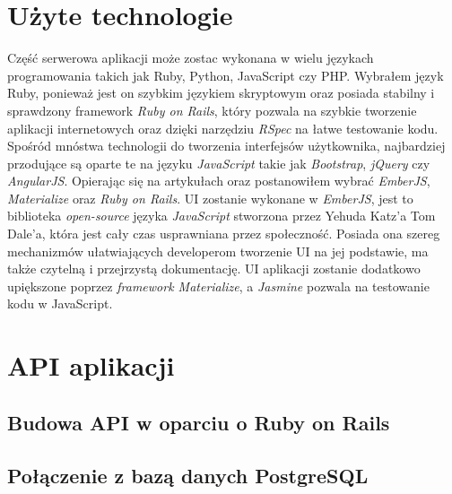\documentclass[brudnopis]{xmgr}
\begin{document}
\section{Użyte technologie}
Część serwerowa aplikacji może zostac wykonana w wielu językach programowania takich jak Ruby, Python, JavaScript czy PHP.
Wybrałem język Ruby, ponieważ jest on szybkim językiem skryptowym oraz posiada stabilny i sprawdzony framework \textit{Ruby on Rails}, który pozwala na szybkie tworzenie aplikacji internetowych oraz dzięki narzędziu \textit{RSpec} na łatwe testowanie kodu. 
Spośród mnóstwa technologii do tworzenia interfejsów użytkownika, najbardziej przodujące są oparte te na języku \textit{JavaScript} takie jak \textit{Bootstrap},\textit{ jQuery} czy\\ \textit{AngularJS}. Opierając się na artykułach \cite{} oraz \cite{} postanowiłem wybrać \textit{EmberJS}, \textit{Materialize} oraz \textit{Ruby on Rails}. UI zostanie wykonane w \textit{EmberJS}, jest to  biblioteka  \textit{open-source} języka \textit{JavaScript} stworzona  przez  Yehuda Katz'a  Tom Dale'a, która jest cały czas usprawniana przez społeczność. Posiada ona szereg mechanizmów ułatwiających developerom tworzenie UI na jej podstawie, ma także czytelną i przejrzystą dokumentację. UI aplikacji zostanie dodatkowo upiększone poprzez \textit{framework Materialize}, a \textit{Jasmine} pozwala na testowanie kodu w JavaScript.

\section{API aplikacji}
\subsection{Budowa API w oparciu o Ruby on Rails}
\subsection{Połączenie z bazą danych PostgreSQL}
\end{document}
